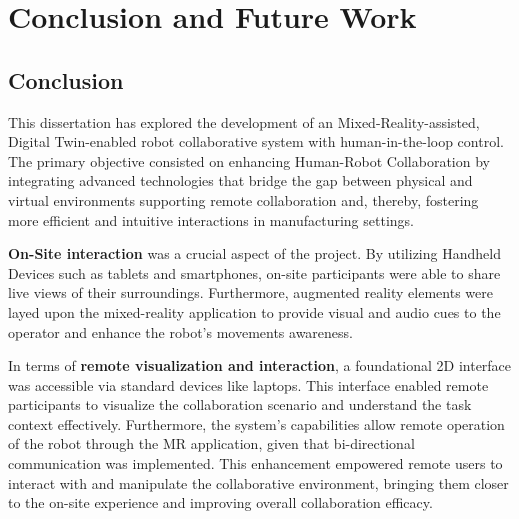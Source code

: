 \chapter{Conclusion and Future Work}%



\section{Conclusion}

This dissertation has explored the development of an Mixed-Reality-assisted, Digital Twin-enabled robot collaborative system with human-in-the-loop control. The primary objective consisted on enhancing Human-Robot Collaboration by integrating advanced technologies that bridge the gap between physical and virtual environments supporting remote collaboration and, thereby, fostering more efficient and intuitive interactions in manufacturing settings.

\textbf{On-Site interaction} was a crucial aspect of the project. By utilizing Handheld Devices such as tablets and smartphones, on-site participants were able to share live views of their surroundings. Furthermore, augmented reality elements were layed upon the mixed-reality application to provide visual and audio cues to the operator and enhance the robot's movements awareness. 

In terms of \textbf{remote visualization and interaction}, a foundational 2D interface was accessible via standard devices like laptops. This interface enabled remote participants to visualize the collaboration scenario and understand the task context effectively. Furthermore, the system's capabilities allow remote operation of the robot through the \ac{MR} application, given that bi-directional communication was implemented. This enhancement empowered remote users to interact with and manipulate the collaborative environment, bringing them closer to the on-site experience and improving overall collaboration efficacy.



